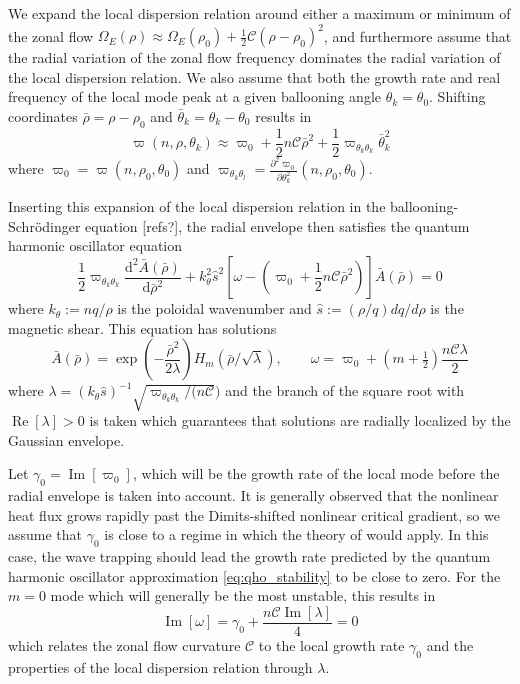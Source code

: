 \documentclass[]{article}
\begin{document}
We expand the local dispersion relation around either a maximum or minimum of the zonal flow \(\Omega_E(\rho) \approx \Omega_E(\rho_0) + \tfrac{1}{2}\mathcal{C} (\rho-\rho_0)^2\), and furthermore assume that the radial variation of the zonal flow frequency dominates the radial variation of the local dispersion relation.
We also assume that both the growth rate and real frequency of the local mode peak at a given ballooning angle \(\theta_k = \theta_0\).
Shifting coordinates \(\bar{\rho} = \rho - \rho_0\) and \(\bar{\theta}_k = \theta_k - \theta_0\) results in
\begin{equation}
    \varpi(n,\rho,\theta_k) \approx \varpi_0 + \frac{1}{2} n \mathcal{C} \bar{\rho}^2 + \frac{1}{2} \varpi_{\theta_k\theta_k} \bar{\theta}_k^2
\end{equation}
where \(\varpi_0 = \varpi(n,\rho_0,\theta_0)\) and \(\varpi_{\theta_k \theta_l} = \frac{\partial^2 \varpi_0}{\partial \theta_k^2}(n,\rho_0,\theta_0)\).

Inserting this expansion of the local dispersion relation in the ballooning-Schr\"{o}dinger equation [refs?], the radial envelope then satisfies the quantum harmonic oscillator equation \citep{xie_global_2016}
\begin{equation}
    \frac{1}{2} \varpi_{\theta_k \theta_k} \frac{\mathrm{d}^2\bar{A}(\bar{\rho})}{\mathrm{d}\bar{\rho}^2} + k_\theta^2 \hat{s}^2 [\omega - (\varpi_0 + \frac{1}{2}n \mathcal{C} \bar{\rho}^2)] \bar{A}(\bar{\rho}) = 0
\end{equation}
where \(k_\theta := n q / \rho\) is the poloidal wavenumber and \(\hat{s} := (\rho/q) dq/d\rho\) is the magnetic shear.
This equation has solutions
\begin{equation} \label{eq:qho_stability}
    \bar{A}(\bar{\rho}) = \exp(-\frac{\bar{\rho}^2}{2 \lambda}) H_m(\bar{\rho}/\sqrt{\lambda}), \qquad \omega = \varpi_0 + (m + \tfrac{1}{2}) \frac{n \mathcal{C} \lambda}{2}
\end{equation}
where \(\lambda = (k_\theta \hat{s})^{-1} \sqrt{\varpi_{\theta_k \theta_k} / (n \mathcal{C}})\) and the branch of the square root with \(\operatorname{Re}[\lambda] > 0\) is taken which guarantees that solutions are radially localized by the Gaussian envelope.

Let \(\gamma_0 = \operatorname{Im}[\varpi_0]\), which will be the growth rate of the local mode before the radial envelope is taken into account.
It is generally observed that the nonlinear heat flux grows rapidly past the Dimits-shifted nonlinear critical gradient, so we assume that \(\gamma_0\) is close to a regime in which the theory of \citet{zhu_theory_2020} would apply.
In this case, the wave trapping should lead the growth rate predicted by the quantum harmonic oscillator approximation \eqref{eq:qho_stability} to be close to zero.
For the \(m=0\) mode which will generally be the most unstable, this results in
\begin{equation} \label{eq:qho_dimits}
    \operatorname{Im}[\omega] = \gamma_0 + \frac{n \mathcal{C} \operatorname{Im}[\lambda]}{4} = 0
\end{equation}
which relates the zonal flow curvature \(\mathcal{C}\) to the local growth rate \(\gamma_0\) and the properties of the local dispersion relation through \(\lambda\).
\end{document}
